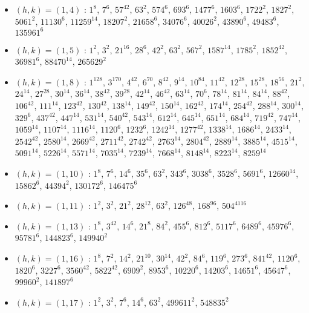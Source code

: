 \begin{itemize}
\item $(h,k)=(1,4)$ : $1^{8}$, $7^{6}$, $57^{42}$, $63^{2}$, $574^{6}$, $693^{6}$, $1477^{6}$, $1603^{6}$, $1722^{2}$, $1827^{2}$, $5061^{2}$, $11130^{6}$, $11259^{14}$, $18207^{2}$, $21658^{6}$, $34076^{6}$, $40026^{2}$, $43890^{6}$, $49483^{6}$, $135961^{6}$
\item $(h,k)=(1,5)$ : $1^{2}$, $3^{2}$, $21^{16}$, $28^{6}$, $42^{2}$, $63^{2}$, $567^{2}$, $1587^{14}$, $1785^{2}$, $1852^{42}$, $36981^{6}$, $88470^{14}$, $265629^{2}$
\item $(h,k)=(1,8)$ : $1^{128}$, $3^{170}$, $4^{42}$, $6^{70}$, $8^{42}$, $9^{14}$, $10^{84}$, $11^{42}$, $12^{28}$, $15^{28}$, $18^{56}$, $21^{2}$, $24^{14}$, $27^{28}$, $30^{14}$, $36^{14}$, $38^{42}$, $39^{28}$, $42^{14}$, $46^{42}$, $63^{14}$, $70^{6}$, $78^{14}$, $81^{14}$, $84^{14}$, $88^{42}$, $106^{42}$, $111^{14}$, $123^{42}$, $130^{42}$, $138^{14}$, $149^{42}$, $150^{14}$, $162^{42}$, $174^{14}$, $254^{42}$, $288^{14}$, $300^{14}$, $329^{6}$, $437^{42}$, $447^{14}$, $531^{14}$, $540^{42}$, $543^{14}$, $612^{14}$, $645^{14}$, $651^{14}$, $684^{14}$, $719^{42}$, $747^{14}$, $1059^{14}$, $1107^{14}$, $1116^{14}$, $1120^{6}$, $1232^{6}$, $1242^{14}$, $1277^{42}$, $1338^{14}$, $1686^{14}$, $2433^{14}$, $2542^{42}$, $2580^{14}$, $2669^{42}$, $2711^{42}$, $2742^{42}$, $2763^{14}$, $2804^{42}$, $2889^{14}$, $3885^{14}$, $4515^{14}$, $5091^{14}$, $5226^{14}$, $5571^{14}$, $7035^{14}$, $7239^{14}$, $7668^{14}$, $8148^{14}$, $8223^{14}$, $8259^{14}$
\item $(h,k)=(1,10)$ : $1^{8}$, $7^{6}$, $14^{6}$, $35^{6}$, $63^{2}$, $343^{6}$, $3038^{6}$, $3528^{6}$, $5691^{6}$, $12660^{14}$, $15862^{6}$, $44394^{2}$, $130172^{6}$, $146475^{6}$
\item $(h,k)=(1,11)$ : $1^{2}$, $3^{2}$, $21^{2}$, $28^{12}$, $63^{2}$, $126^{48}$, $168^{96}$, $504^{4116}$
\item $(h,k)=(1,13)$ : $1^{8}$, $3^{42}$, $14^{6}$, $21^{8}$, $84^{2}$, $455^{6}$, $812^{6}$, $5117^{6}$, $6489^{6}$, $45976^{6}$, $95781^{6}$, $144823^{6}$, $149940^{2}$
\item $(h,k)=(1,16)$ : $1^{8}$, $7^{2}$, $14^{2}$, $21^{10}$, $30^{14}$, $42^{2}$, $84^{6}$, $119^{6}$, $273^{6}$, $841^{42}$, $1120^{6}$, $1820^{6}$, $3227^{6}$, $3560^{42}$, $5822^{42}$, $6909^{2}$, $8953^{6}$, $10220^{6}$, $14203^{6}$, $14651^{6}$, $45647^{6}$, $99960^{2}$, $141897^{6}$
\item $(h,k)=(1,17)$ : $1^{2}$, $3^{2}$, $7^{6}$, $14^{6}$, $63^{2}$, $499611^{2}$, $548835^{2}$

\end{itemize}
